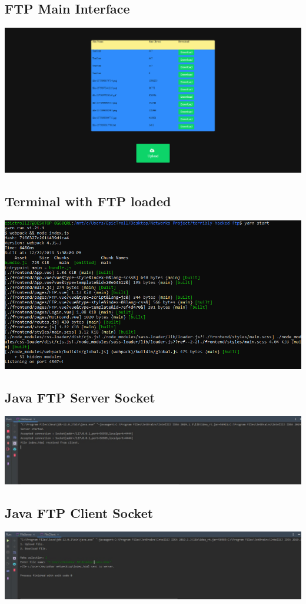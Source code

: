 \documentclass[12pt]{article}
\begin{document}
\subsection{FTP Main Interface}
\includegraphics[scale=0.3]{images/dirlist.png}
\subsection{Terminal with FTP loaded}
\includegraphics[scale=0.6]{images/bash.png}
\subsection{Java FTP Server Socket}
\includegraphics[scale=0.4]{images/server.jpeg}
\subsection{Java FTP Client Socket}
\includegraphics[scale=0.4]{images/client.jpeg}
\end{document}
